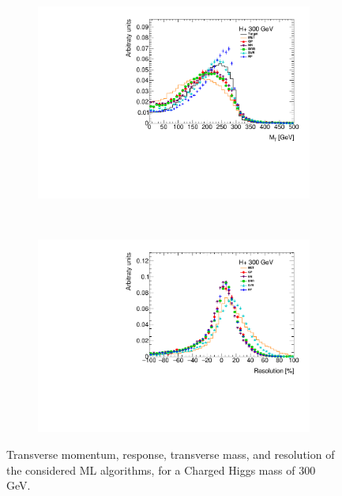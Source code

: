 \documentclass[twocolumn]{scrartcl}
\begin{document}
\begin{figure}[htpb]
    \begin{subfigure}{.48\textwidth}
        \includegraphics[width=\textwidth]{plots/mt_300.pdf}
    \end{subfigure}
    ~
    \begin{subfigure}{.48\textwidth}
        \includegraphics[width=\textwidth]{plots/resolution_300.pdf}
    \end{subfigure}
    \caption{Transverse momentum, response, transverse mass, and resolution of the considered ML algorithms, for a Charged Higgs mass of 300 GeV.}\label{fig:result300}
\end{figure}
\end{document}
